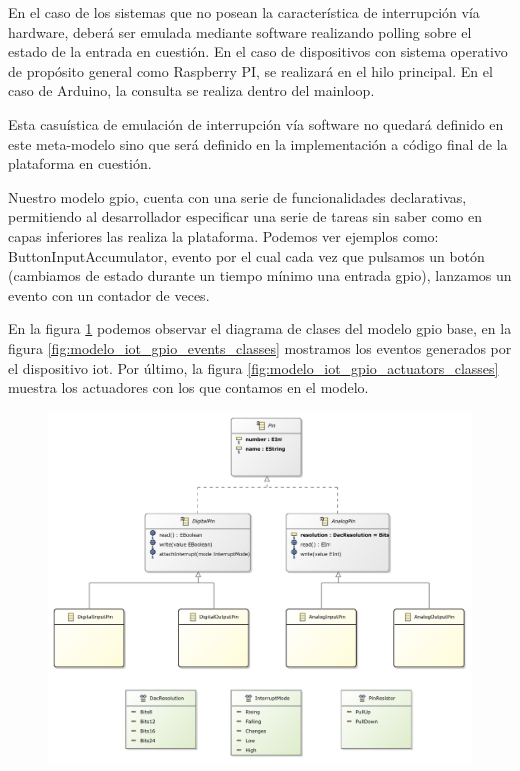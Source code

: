 En el caso de los sistemas que no posean la característica de interrupción vía hardware, deberá ser emulada mediante software realizando polling sobre el estado de la entrada en cuestión. En el caso de dispositivos con sistema operativo de propósito general como Raspberry PI, se realizará en el hilo principal. En el caso de Arduino, la consulta se realiza dentro del \gls{mainloop}.

Esta casuística de emulación de interrupción vía software no quedará definido en este meta-modelo sino que será definido en la implementación a código final de la plataforma en cuestión.

Nuestro modelo \gls{gpio}, cuenta con una serie de funcionalidades declarativas, permitiendo al desarrollador especificar una serie de tareas sin saber como en capas inferiores las realiza la plataforma. Podemos ver ejemplos como: ButtonInputAccumulator, evento por el cual cada vez que pulsamos un botón (cambiamos de estado durante un tiempo mínimo una entrada \gls{gpio}), lanzamos un evento con un contador de veces.

En la figura \ref{fig:modelo_iot_gpio_classes} podemos observar el diagrama de clases del modelo \gls{gpio} base, en la figura \ref{fig:modelo_iot_gpio_events_classes} mostramos los eventos generados por el dispositivo \gls{iot}. Por último, la figura \ref{fig:modelo_iot_gpio_actuators_classes} muestra los actuadores con los que contamos en el modelo. 

\begin{figure}
	\centering
    \includegraphics[height=0.3\textheight]{images/models/gpios_class_diagram.pdf}
    \label{fig:modelo_iot_gpio_classes}
\end{figure}

